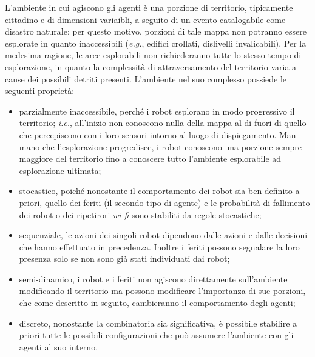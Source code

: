L'ambiente in cui agiscono gli agenti è una porzione di territorio, tipicamente cittadino e di dimensioni variaibli, a seguito di un evento catalogabile come disastro naturale; per questo motivo, porzioni di tale mappa non potranno essere esplorate in quanto inaccessibili (\textit{e.g.}, edifici crollati, dislivelli invalicabili). Per la medesima ragione, le aree esplorabili non richiederanno tutte lo stesso tempo di esplorazione, in quanto la complessità di attraversamento del territorio varia a cause dei possibili detriti presenti.
L'ambiente nel suo complesso possiede le seguenti proprietà:
\begin{itemize}
	\item parzialmente inaccessibile, perché i robot esplorano in modo progressivo il territorio; \textit{i.e.}, all'inizio non conoscono nulla della mappa al di fuori di quello che percepiscono con i loro sensori intorno al luogo di dispiegamento. Man mano che l'esplorazione progredisce, i robot conoscono una porzione sempre maggiore del territorio fino a conoscere tutto l'ambiente esplorabile ad esplorazione ultimata;
	\item stocastico, poiché nonostante il comportamento dei robot sia ben definito a priori, quello dei feriti (il secondo tipo di agente) e le probabilità di fallimento dei robot o dei ripetirori \textit{wi-fi} sono stabiliti da regole stocastiche;
	\item sequenziale, le azioni dei singoli robot dipendono dalle azioni e dalle decisioni che hanno effettuato in precedenza. Inoltre i feriti possono segnalare la loro presenza solo se non sono già stati individuati dai robot;
	\item semi-dinamico, i robot e i feriti non agiscono direttamente sull'ambiente modificando il territorio ma possono modificare l'importanza di sue porzioni, che come descritto in seguito, cambieranno il comportamento degli agenti;
	\item discreto, nonostante la combinatoria sia significativa, è possibile stabilire a priori tutte le possibili configurazioni che può assumere l'ambiente con gli agenti al suo interno.
\end{itemize}

